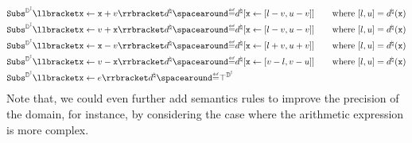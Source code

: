 \begin{description}
\begin{align*}
    &\intervalabstractdomainsubstitute \substitutionof{\defvariable}{\defvariable + \defvalue}\defabstractvalue \DefeQ \updatemem{\defabstractvalue}{\defvariable}{\interval{l-\defvalue}{u-\defvalue}} \tag*{where $\interval{l}{u} = \defabstractvalue(\defvariable)$} \\
    &\intervalabstractdomainsubstitute \substitutionof{\defvariable}{\defvalue + \defvariable}\defabstractvalue \DefeQ \updatemem{\defabstractvalue}{\defvariable}{\interval{l-\defvalue}{u-\defvalue}} \tag*{where $\interval{l}{u} = \defabstractvalue(\defvariable)$} \\
    &\intervalabstractdomainsubstitute \substitutionof{\defvariable}{\defvariable - \defvalue}\defabstractvalue \DefeQ \updatemem{\defabstractvalue}{\defvariable}{\interval{l+\defvalue}{u+\defvalue}} \tag*{where $\interval{l}{u} = \defabstractvalue(\defvariable)$} \\
    &\intervalabstractdomainsubstitute \substitutionof{\defvariable}{\defvalue - \defvariable}\defabstractvalue \DefeQ \updatemem{\defabstractvalue}{\defvariable}{\interval{\defvalue-l}{\defvalue-u}} \tag*{where $\interval{l}{u} = \defabstractvalue(\defvariable)$} \\
    &\intervalabstractdomainsubstitute \substitutionof{\defvariable}{\defaexp} \defabstractvalue \DefeQ \intervalabstractdomaintop
  \end{align*}
  Note that, we could even further add semantics rules to improve the precision of the domain, for instance, by considering the case where the arithmetic expression is more complex.


\end{description}
